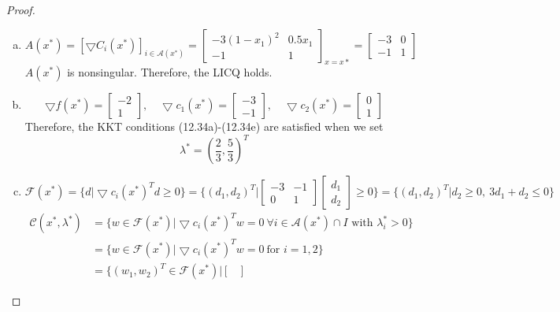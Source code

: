 \documentclass[11pt,a4paper]{article}
\renewcommand{\(}{\left(}
\renewcommand{\)}{\right)}
\begin{document}
  \begin{proof}
  \begin{enumerate}[(a)]
  \item \[ A(x^\ast)=\left[ \bigtriangledown C_i(x^\ast) \right]_{i \in \mathcal{A}(x^\ast)} =
  \begin{bmatrix}
  -3(1-x_1)^2 & 0.5x_1\\
  -1 & 1
  \end{bmatrix}_{x=x\ast}=
  \begin{bmatrix}
  -3 & 0\\
  -1 & 1
  \end{bmatrix}\]
  $A(x^\ast)$ is nonsingular. Therefore, the LICQ holds.
  \item \[ \bigtriangledown f(x^\ast)=
  \begin{bmatrix}
  -2\\
  1
  \end{bmatrix}, \quad
  \bigtriangledown c_1(x^\ast)=
  \begin{bmatrix}
  -3\\
  -1
  \end{bmatrix}, \quad
  \bigtriangledown c_2(x^\ast)=
  \begin{bmatrix}
  0\\
  1
  \end{bmatrix}\]
  Therefore, the KKT conditions (12.34a)-(12.34e) are satisfied when we set
  \[ \lambda^\ast= \left(\frac{2}{3},\frac{5}{3}\right)^T\]
  \item \[ \mathcal{F}(x^\ast)=\lbrace d\vert \bigtriangledown c_i(x^\ast)^Td \geq 0 \rbrace =\lbrace (d_1,d_2)^T \vert 
  \begin{bmatrix}
  -3 & -1\\
  0 & 1
  \end{bmatrix}
  \begin{bmatrix}
  d_1\\
  d_2  
  \end{bmatrix}     \geq 0 \rbrace
  =\lbrace (d_1,d_2)^T \vert d_2 \geq 0,~3d_1+d_2 \leq 0 \rbrace \]
  \begin{align*}
  \mathcal{C}(x^\ast,\lambda^\ast) 
  &=\lbrace w \in \mathcal{F}(x^\ast) \vert \bigtriangledown c_i(x^\ast)^Tw=0~\forall i \in \mathcal{A}(x^\ast)\cap I \mbox{ with } \lambda_i^\ast > 0 \rbrace\\
  &=\lbrace w \in \mathcal{F}(x^\ast) \vert \bigtriangledown c_i(x^\ast)^Tw=0~\mbox{for }i=1,2 \rbrace\\
  &=\lbrace (w_1,w_2)^T \in \mathcal{F}(x^\ast) \vert
  \begin{bmatrix}

\end{bmatrix}
\end{align*}
\end{enumerate}
\end{proof}
\end{document}
